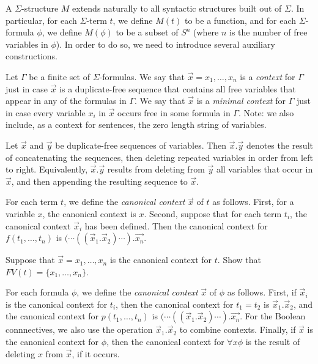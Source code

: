 A $\Sigma$-structure $M$ extends naturally to all syntactic structures
built out of $\Sigma$.  In particular, for each $\Sigma$-term $t$, we
define $M(t)$ to be a function, and for each $\Sigma$-formula $\phi$,
we define $M(\phi )$ to be a subset of $S^n$ (where $n$ is the number
of free variables in $\phi$).  In order to do so, we need to introduce
several auxiliary constructions.


\begin{defn} Let $\Gamma$ be a finite set of $\Sigma$-formulas.  We
  say that $\vec{x}=x_1,\dots ,x_n$ is a \emph{context} for $\Gamma$
  just in case $\vec{x}$ is a duplicate-free sequence that contains
  all free variables that appear in any of the formulas in $\Gamma$.
  We say that $\vec{x}$ is a \emph{minimal context} for $\Gamma$ just
  in case every variable $x_i$ in $\vec{x}$ occurs free in some
  formula in $\Gamma$.  Note: we also include, as a context for
  sentences, the zero length string of variables. \end{defn}

\begin{defn} Let $\vec{x}$ and $\vec{y}$ be duplicate-free sequences
  of variables.  Then $\vec{x}.\vec{y}$ denotes the result of
  concatenating the sequences, then deleting repeated variables in
  order from left to right.  Equivalently, $\vec{x}.\vec{y}$ results
  from deleting from $\vec{y}$ all variables that occur in $\vec{x}$,
  and then appending the resulting sequence to $\vec{x}$. \end{defn}

\begin{defn} For each term $t$, we define the \emph{canonical context}
  $\vec{x}$ of $t$ as follows.  First, for a variable $x$, the
  canonical context is $x$.  Second, suppose that for each term $t_i$,
  the canonical context $\vec{x}_i$ has been defined.  Then the
  canonical context for $f(t_1,\dots ,t_n)$ is
  $(\cdots ((\vec{x}_1.\vec{x}_2)\cdots ).\vec{x_n}$. \end{defn}

\begin{exercise} Suppose that $\vec{x}=x_1,\dots ,x_n$ is the
  canonical context for $t$.  Show that $FV(t)=\{ x_1,\dots
  ,x_n\}$. \end{exercise}

\begin{defn} For each formula $\phi$, we define the \emph{canonical
    context} $\vec{x}$ of $\phi$ as follows.  First, if $\vec{x}_i$ is
  the canonical context for $t_i$, then the canonical context for
  $t_1=t_2$ is $\vec{x}_1.\vec{x}_2$, and the canonical context for
  $p(t_1,\dots ,t_n)$ is
  $(\cdots ((\vec{x}_1.\vec{x}_2)\cdots ).\vec{x_n}$.  For the Boolean
  connnectives, we also use the operation $\vec{x}_1.\vec{x}_2$ to
  combine contexts.  Finally, if $\vec{x}$ is the canonical context
  for $\phi$, then the canonical context for $\forall x\phi$ is the
  result of deleting $x$ from $\vec{x}$, if it occurs.  \end{defn}

